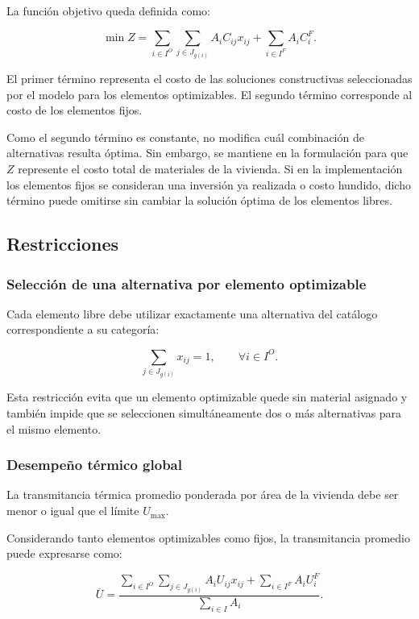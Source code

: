 La función objetivo queda definida como:

\[
\min Z =
\sum_{i\in I^{O}}
\sum_{j\in J_{g(i)}}
A_i C_{ij}x_{ij}
+
\sum_{i\in I^{F}}
A_i C_i^{F}.
\]

El primer término representa el costo de las soluciones constructivas
seleccionadas por el modelo para los elementos optimizables. El segundo
término corresponde al costo de los elementos fijos.

Como el segundo término es constante, no modifica cuál combinación de
alternativas resulta óptima. Sin embargo, se mantiene en la formulación para
que $Z$ represente el costo total de materiales de la vivienda. Si en la
implementación los elementos fijos se consideran una inversión ya realizada
o costo hundido, dicho término puede omitirse sin cambiar la solución
óptima de los elementos libres.

\subsection{Restricciones}

\subsubsection{Selección de una alternativa por elemento optimizable}

Cada elemento libre debe utilizar exactamente una alternativa del catálogo
correspondiente a su categoría:

\[
\sum_{j\in J_{g(i)}} x_{ij}=1,
\qquad
\forall i\in I^{O}.
\]

Esta restricción evita que un elemento optimizable quede sin material
asignado y también impide que se seleccionen simultáneamente dos o más
alternativas para el mismo elemento.

\subsubsection{Desempeño térmico global}

La transmitancia térmica promedio ponderada por área de la vivienda debe
ser menor o igual que el límite $U_{\max}$.

Considerando tanto elementos optimizables como fijos, la transmitancia promedio
puede expresarse como:

\[
\overline{U} =
\frac{
\displaystyle
\sum_{i\in I^{O}}
\sum_{j\in J_{g(i)}}
A_iU_{ij}x_{ij}
+
\sum_{i\in I^{F}}
A_iU_i^{F}
}{
\displaystyle
\sum_{i\in I}A_i
}.
\]

